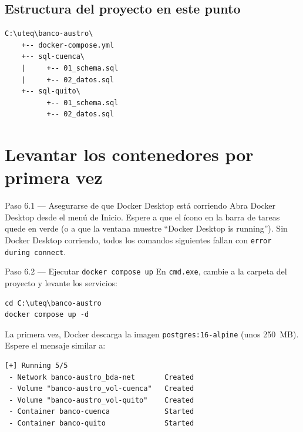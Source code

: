 \documentclass[11pt,a4paper]{article}
\begin{document}
\subsection{Estructura del proyecto en este punto}

\begin{lstlisting}[style=plainstyle,caption={C:\textbackslash uteq\textbackslash banco-austro tras crear todos los scripts}]
C:\uteq\banco-austro\
    +-- docker-compose.yml
    +-- sql-cuenca\
    |     +-- 01_schema.sql
    |     +-- 02_datos.sql
    +-- sql-quito\
          +-- 01_schema.sql
          +-- 02_datos.sql
\end{lstlisting}

\clearpage
\section{Levantar los contenedores por primera vez}

\begin{pasobox}{Paso 6.1 --- Asegurarse de que Docker Desktop est\'a corriendo}
Abra Docker Desktop desde el men\'u de Inicio. Espere a que el \'icono en la barra de tareas quede en verde (o a que la ventana muestre ``Docker Desktop is running''). Sin Docker Desktop corriendo, todos los comandos siguientes fallan con \texttt{error during connect}.
\end{pasobox}

\begin{pasobox}{Paso 6.2 --- Ejecutar \texttt{docker compose up}}
En \texttt{cmd.exe}, cambie a la carpeta del proyecto y levante los servicios:

\begin{lstlisting}[style=bashstyle]
cd C:\uteq\banco-austro
docker compose up -d
\end{lstlisting}

La primera vez, Docker descarga la imagen \texttt{postgres:16-alpine} (unos 250~MB). Espere el mensaje similar a:

\begin{lstlisting}[style=plainstyle]
[+] Running 5/5
 - Network banco-austro_bda-net       Created
 - Volume "banco-austro_vol-cuenca"   Created
 - Volume "banco-austro_vol-quito"    Created
 - Container banco-cuenca             Started
 - Container banco-quito              Started
\end{lstlisting}
\end{pasobox}
\end{document}

